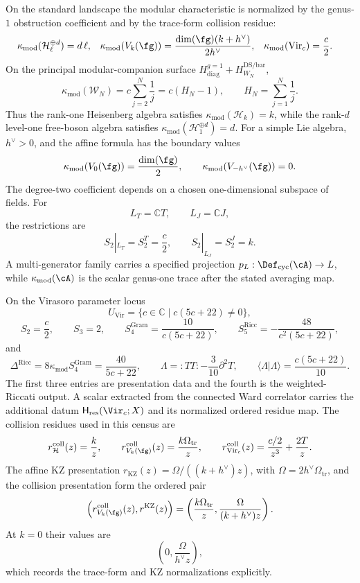 \begin{remark}
On the standard landscape the modular characteristic is normalized by
the genus-$1$ obstruction coefficient and by the trace-form collision
residue:
\[
\begin{aligned}
\kappa_{\mathrm{mod}}(\mathcal H_{\ell}^{\oplus d}) &= d\,\ell,
&
\kappa_{\mathrm{mod}}(V_k(\fg)) &= \frac{\dim(\fg)(k+h^\vee)}{2h^\vee},
&
\kappa_{\mathrm{mod}}(\mathrm{Vir}_c) &= \frac{c}{2}.
\end{aligned}
\]
On the principal modular-companion surface
\(H_{\mathrm{diag}}^{g=1}+H_{W_N}^{\mathrm{DS/bar}}\),
\[
 \kappa_{\mathrm{mod}}(\mathcal W_N)
 =c\sum_{j=2}^{N}\frac1j
 =c(H_N-1),
 \qquad
 H_N=\sum_{j=1}^{N}\frac1j.
\]
Thus the rank-one Heisenberg algebra satisfies
\(\kappa_{\mathrm{mod}}(\mathcal H_k)=k\), while the rank-\(d\)
level-one free-boson algebra satisfies
\(\kappa_{\mathrm{mod}}(\mathcal H_1^{\oplus d})=d\).
For a simple Lie algebra, \(h^\vee>0\), and the affine formula has the
boundary values
\[
\kappa_{\mathrm{mod}}(V_0(\fg))=\frac{\dim(\fg)}{2},\qquad
\kappa_{\mathrm{mod}}(V_{-h^\vee}(\fg))=0.
\]
The degree-two coefficient depends on a chosen one-dimensional
subspace of fields.  For
\[
L_T=\mathbb C T,\qquad L_J=\mathbb C J,
\]
the restrictions are
\[
S_2|_{L_T}=S_2^T=\frac c2,\qquad
S_2|_{L_J}=S_2^J=k.
\]
A multi-generator family carries a specified projection
\(p_L:\Def_{\mathrm{cyc}}(\cA)\to L\), while
\(\kappa_{\mathrm{mod}}(\cA)\) is the scalar genus-one trace after
the stated averaging map.

On the Virasoro parameter locus
\[
U_{\mathrm{Vir}}
=\{c\in\mathbb C\mid c(5c+22)\ne0\},
\]
\[
S_2=\frac c2,\qquad
S_3=2,\qquad
S_4^{\mathrm{Gram}}=\frac{10}{c(5c+22)},\qquad
S_5^{\mathrm{Ricc}}=-\frac{48}{c^2(5c+22)},
\]
and
\[
\Delta^{\mathrm{Ricc}}=8\kappa_{\mathrm{mod}} S_4^{\mathrm{Gram}}
=\frac{40}{5c+22},\qquad
\Lambda={:}TT{:}-\frac{3}{10}\partial^2T,\qquad
\langle\Lambda|\Lambda\rangle=\frac{c(5c+22)}{10}.
\]
The first three entries are presentation data and the fourth is the
weighted-Riccati output.  A scalar extracted from the connected Ward
correlator carries the additional datum
$\mathsf H_{\mathrm{res}}(\Vir_c;X)$ and its normalized ordered
residue map.
The collision residues used in this census are
\[
r_{\mathcal H}^{\mathrm{coll}}(z)=\frac{k}{z},\qquad
r_{V_k(\fg)}^{\mathrm{coll}}(z)=\frac{k\Omega_{\mathrm{tr}}}{z},
\qquad
r_{\mathrm{Vir}_c}^{\mathrm{coll}}(z)=\frac{c/2}{z^3}+\frac{2T}{z}.
\]
The affine KZ presentation
$r_{\mathrm{KZ}}(z)=\Omega/((k+h^\vee)z)$, with
$\Omega=2h^\vee\Omega_{\mathrm{tr}}$, and the collision presentation
form the ordered pair
\[
\left(
r^{\mathrm{coll}}_{V_k(\fg)}(z),
r^{\mathrm{KZ}}(z)
\right)
=
\left(
\frac{k\Omega_{\mathrm{tr}}}{z},
\frac{\Omega}{(k+h^\vee)z}
\right).
\]
At \(k=0\) their values are
\[
\left(0,\frac{\Omega}{h^\vee z}\right),
\]
which records the trace-form and KZ normalizations explicitly.
\smallskip


\end{remark}
